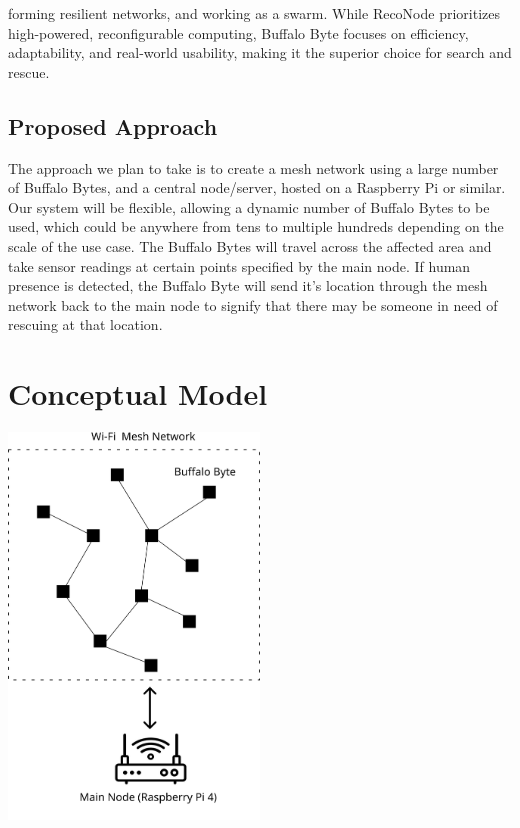 \documentclass[10pt]{article}
\begin{document}
forming resilient networks, and working as a swarm. While RecoNode prioritizes high-powered, reconfigurable computing, Buffalo Byte focuses on efficiency, adaptability, and real-world usability, making it the superior choice for search and rescue.
\subsection*{Proposed Approach}
The approach we plan to take is to create a mesh network using a large number of Buffalo Bytes, and a central node/server, hosted on a Raspberry Pi or similar. Our system will be flexible, allowing a dynamic number of Buffalo Bytes to be used, which could be anywhere from tens to multiple hundreds depending on the scale of the use case. The Buffalo Bytes will travel across the affected area and take sensor readings at certain points specified by the main node. If human presence is detected, the Buffalo Byte will send it's location through the mesh network back to the main node to signify that there may be someone in need of rescuing at that location.

\section*{Conceptual Model}
\begin{center}
\includegraphics[width=0.5\textwidth]{conceptual-model}\\
\end{center}
\end{document}
